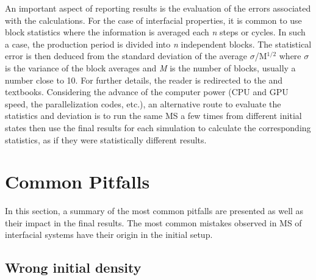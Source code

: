 \documentclass{scrbook}
\begin{document}
An important aspect of reporting results is the evaluation of the errors
associated with the calculations. For the case of interfacial properties, it is
common to use block statistics where the information is averaged each
\textit{n} steps or cycles. In such a case, the production period is divided
into \textit{n} independent blocks. The statistical error is then deduced from
the standard deviation of the average ${\sigma}$/M$^{\mathrm{1/2}}$ where
${\sigma}$ is the variance of the block averages and \textit{M} is the number
of blocks, usually a number close to 10. For further details, the reader is
redirected to the \citet{allen2017}
and \citet{frenkel2002}
textbooks. Considering the advance of the computer power (CPU and GPU speed,
the parallelization codes, etc.), an alternative route to evaluate the
statistics and deviation is to run the same MS a few times from different
initial states then use the final results for each simulation to calculate the
corresponding statistics, as if they were statistically different results.


\chapter{Common Pitfalls}

In this section, a summary of the most common pitfalls are presented as well as
their impact in the final results. The most common mistakes observed in MS of
interfacial systems have their origin in the initial setup. 

\section{Wrong initial density}
\end{document}
